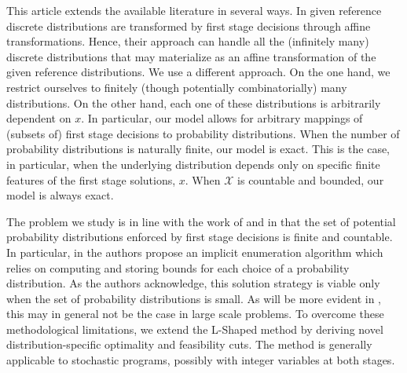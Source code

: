 \documentclass[12pt]{article}
\theoremstyle{thmstylethree}%
\begin{document}
This article extends the available literature in several ways.
In \cite{Hel16,HelBT18} given reference discrete distributions are transformed by first stage decisions through affine transformations.
Hence, their approach can handle all the (infinitely many) discrete distributions that may materialize as an affine transformation of the given reference distributions.
We use a different approach. On the one hand, we restrict ourselves to finitely (though potentially combinatorially) many distributions.
On the other hand, each one of these distributions is arbitrarily dependent on $x$.
In particular, our model allows for arbitrary mappings of (subsets of) first stage decisions to probability distributions.
When the number of probability distributions is naturally finite, our model is exact. This is the case, in particular, when the underlying distribution depends only on specific finite features of the first stage solutions, $x$. When $\mathcal{X}$ is countable and bounded, our model is always exact.


The problem we study is in line with the work of \cite{JonWW98} and \cite{Pan21} in that the set of potential probability distributions enforced by first stage decisions is finite and countable. In particular, in \cite{JonWW98} the authors propose an implicit enumeration algorithm which relies on computing and storing bounds for each choice of a probability distribution. As the authors acknowledge, this solution strategy is viable only when the set of probability distributions is small. 
As will be more evident in , this may in general not be the case in large scale problems. To overcome these methodological limitations, we extend the L-Shaped method by deriving novel distribution-specific optimality and feasibility cuts. The method is generally applicable to stochastic programs, possibly with integer variables at both stages. 
\end{document}
